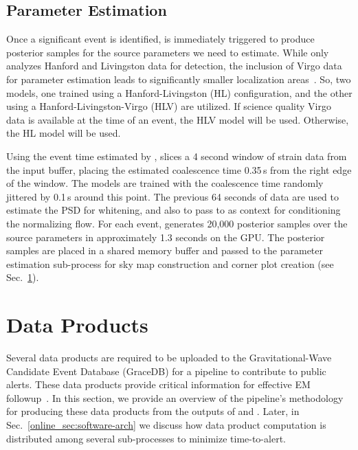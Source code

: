 \begin{refsection}
\subsection{Parameter Estimation} \label{online_sec:amplfi}
Once a significant event is identified, \amplfi is immediately triggered to produce posterior samples for the source parameters we need to estimate. 
While \aframe only analyzes Hanford and Livingston data for detection, the inclusion of Virgo data for parameter estimation leads to significantly smaller localization areas~\cite{PhysRevLett.119.141101}. 
So, two \amplfi models, one trained using a Hanford-Livingston (HL) configuration, and the other using a Hanford-Livingston-Virgo (HLV) are utilized. 
If science quality Virgo data is available at the time of an event, the HLV \amplfi model will be used. 
Otherwise, the HL \amplfi model will be used. 

Using the event time estimated by \aframe, \amplfi slices a 4 second window of strain data from the input buffer, placing the estimated coalescence time 0.35\,s from the right edge of the window. 
The \amplfi models are trained with the coalescence time randomly jittered by 0.1\,s around this point. 
The previous 64 seconds of data are used to estimate the PSD for whitening, and also to pass to \amplfi as context for conditioning the normalizing flow. 
For each event, \amplfi generates 20,000 posterior samples over the source parameters in approximately 1.3 seconds on the GPU.
The posterior samples are placed in a shared memory buffer and passed to the parameter estimation sub-process for sky map construction and corner plot creation (see Sec.~\ref{online_sec:data-products}).

\section{Data Products} \label{online_sec:data-products}
Several data products are required to be uploaded to the Gravitational-Wave Candidate Event Database (GraceDB) for a pipeline to contribute to public alerts. 
These data products provide critical information for effective EM followup~\cite{Chaudhary_2024}. 
In this section, we provide an overview of the pipeline's methodology for producing these data products from the outputs of \aframe and \amplfi.
Later, in Sec.~\ref{online_sec:software-arch} we discuss how data product computation is distributed among several sub-processes to minimize time-to-alert. 


\end{refsection}

